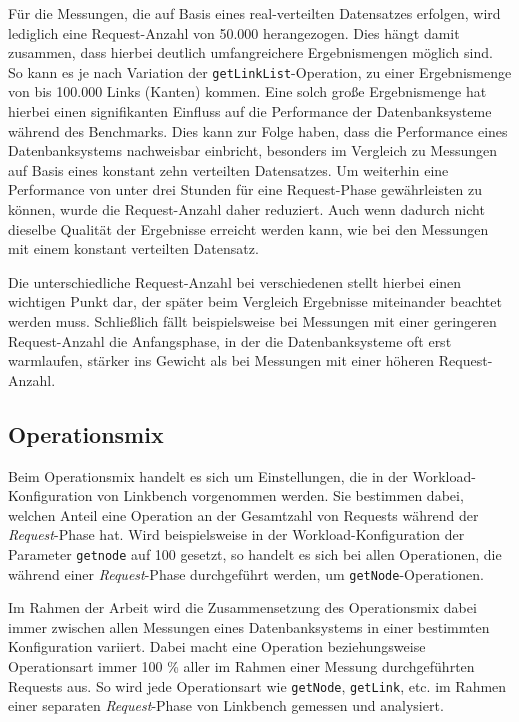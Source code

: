Für die Messungen, die auf Basis eines real-verteilten Datensatzes erfolgen, wird lediglich eine Request-Anzahl von 50.000 herangezogen. Dies hängt damit zusammen, dass hierbei deutlich umfangreichere Ergebnismengen möglich sind. So kann es je nach Variation der \texttt{getLinkList}-Operation, zu einer Ergebnismenge von bis 100.000 Links (Kanten) kommen. Eine solch große Ergebnismenge hat hierbei einen signifikanten Einfluss auf die Performance der Datenbanksysteme während des Benchmarks. Dies kann zur Folge haben, dass die Performance eines Datenbanksystems nachweisbar einbricht, besonders im Vergleich zu Messungen auf Basis eines konstant zehn verteilten Datensatzes. Um weiterhin eine Performance von unter drei Stunden für eine Request-Phase gewährleisten zu können, wurde die Request-Anzahl daher reduziert. Auch wenn dadurch nicht dieselbe Qualität der Ergebnisse erreicht werden kann, wie bei den Messungen mit einem konstant verteilten Datensatz.

Die unterschiedliche Request-Anzahl bei verschiedenen stellt hierbei einen wichtigen Punkt dar, der später beim Vergleich Ergebnisse miteinander beachtet werden muss. Schließlich fällt beispielsweise bei Messungen mit einer geringeren Request-Anzahl die Anfangsphase, in der die Datenbanksysteme oft erst warmlaufen, stärker ins Gewicht als bei Messungen mit einer höheren Request-Anzahl.

\subsection{Operationsmix}
\label{analyse:linkbench:operationsmix}
Beim Operationsmix handelt es sich um Einstellungen, die in der Workload-Konfiguration von Linkbench vorgenommen werden. Sie bestimmen dabei, welchen Anteil eine Operation an der Gesamtzahl von Requests während der \textit{Request}-Phase hat. Wird beispielsweise in der Workload-Konfiguration der Parameter \texttt{getnode} auf 100 gesetzt, so handelt es sich bei allen Operationen, die während einer \textit{Request}-Phase durchgeführt werden, um \texttt{getNode}-Operationen.

Im Rahmen der Arbeit wird die Zusammensetzung des Operationsmix dabei immer zwischen allen Messungen eines Datenbanksystems in einer bestimmten Konfiguration variiert. Dabei macht eine Operation beziehungsweise Operationsart immer 100 \% aller im Rahmen einer Messung durchgeführten Requests aus. So wird jede Operationsart wie \texttt{getNode}, \texttt{getLink}, etc. im Rahmen einer separaten \textit{Request}-Phase von Linkbench gemessen und analysiert.

